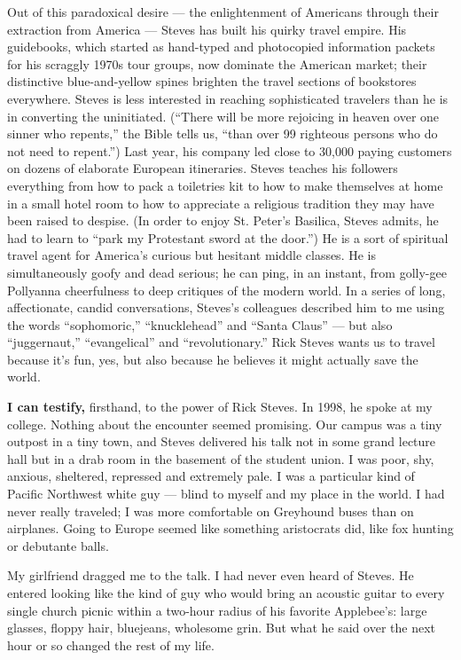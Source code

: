 Out of this paradoxical desire --- the enlightenment of Americans
through their extraction from America --- Steves has built his quirky
travel empire. His guidebooks, which started as hand-typed and
photocopied information packets for his scraggly 1970s tour groups, now
dominate the American market; their distinctive blue-and-yellow spines
brighten the travel sections of bookstores everywhere. Steves is less
interested in reaching sophisticated travelers than he is in converting
the uninitiated. (``There will be more rejoicing in heaven over one
sinner who repents,'' the Bible tells us, ``than over 99 righteous
persons who do not need to repent.'') Last year, his company led close
to 30,000 paying customers on dozens of elaborate European itineraries.
Steves teaches his followers everything from how to pack a toiletries
kit to how to make themselves at home in a small hotel room to how to
appreciate a religious tradition they may have been raised to despise.
(In order to enjoy St. Peter's Basilica, Steves admits, he had to learn
to ``park my Protestant sword at the door.'') He is a sort of spiritual
travel agent for America's curious but hesitant middle classes. He is
simultaneously goofy and dead serious; he can ping, in an instant, from
golly-gee Pollyanna cheerfulness to deep critiques of the modern world.
In a series of long, affectionate, candid conversations, Steves's
colleagues described him to me using the words ``sophomoric,''
``knucklehead'' and ``Santa Claus'' --- but also ``juggernaut,''
``evangelical'' and ``revolutionary.'' Rick Steves wants us to travel
because it's fun, yes, but also because he believes it might actually
save the world.

\textbf{I can testify,} firsthand, to the power of Rick Steves. In 1998,
he spoke at my college. Nothing about the encounter seemed promising.
Our campus was a tiny outpost in a tiny town, and Steves delivered his
talk not in some grand lecture hall but in a drab room in the basement
of the student union. I was poor, shy, anxious, sheltered, repressed and
extremely pale. I was a particular kind of Pacific Northwest white guy
--- blind to myself and my place in the world. I had never really
traveled; I was more comfortable on Greyhound buses than on airplanes.
Going to Europe seemed like something aristocrats did, like fox hunting
or debutante balls.

My girlfriend dragged me to the talk. I had never even heard of Steves.
He entered looking like the kind of guy who would bring an acoustic
guitar to every single church picnic within a two-hour radius of his
favorite Applebee's: large glasses, floppy hair, bluejeans, wholesome
grin. But what he said over the next hour or so changed the rest of my
life.

